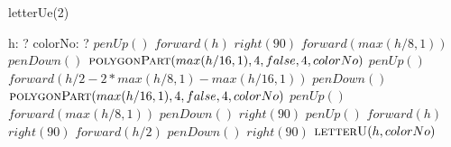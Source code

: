 \documentclass[a4paper,10pt]{article}
\begin{document}
\begin{algorithm}
\caption{letterUe(2)}
\begin{algorithmic}[5]
\State {}
\State {}
    \State h: ?
    \State colorNo: ?
  \EndDecl
  \State \(penUp()\)
  \State \(forward(h)\)
  \State \(right(90)\)
  \State \(forward(max(h/8,1))\)
  \State \(penDown()\)
  \State {}
  \State {}
  \State \(\Call{polygonPart}{max(h/16,1),4,false,4,colorNo}\)
  \State \(penUp()\)
  \State \(forward(h/2-2*max(h/8,1)-max(h/16,1))\)
  \State \(penDown()\)
  \State {}
  \State {}
  \State \(\Call{polygonPart}{max(h/16,1),4,false,4,colorNo}\)
  \State \(penUp()\)
  \State \(forward(max(h/8,1))\)
  \State \(penDown()\)
  \State \(right(90)\)
  \State \(penUp()\)
  \State \(forward(h)\)
  \State \(right(90)\)
  \State \(forward(h/2)\)
  \State \(penDown()\)
  \State \(right(90)\)
  \State \(\Call{letterU}{h,colorNo}\)
\EndProcedure
\end{algorithmic}
\end{algorithm}
\end{document}
